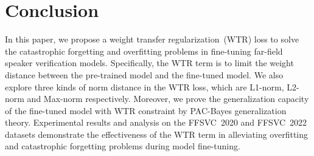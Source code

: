 \documentclass{article}
\begin{document}
 
\section{Conclusion}
 In this paper, we propose a weight transfer regularization~(WTR) loss to solve the catastrophic forgetting and overfitting problems in fine-tuning far-field speaker verification models. Specifically, the WTR term is to limit the weight distance between the pre-trained model and the fine-tuned model. We also explore three kinds of norm distance in the WTR loss, which are L1-norm, L2-norm and Max-norm respectively. Moreover, we prove the generalization capacity of the fine-tuned model with WTR constraint by PAC-Bayes generalization theory. Experimental results and analysis on the FFSVC~2020 and FFSVC~2022 datasets demonstrate the effectiveness of the WTR term in alleviating overfitting and catastrophic forgetting problems during model fine-tuning.

%

\begin{spacing}{0.98}  

\end{spacing}
\end{document}
